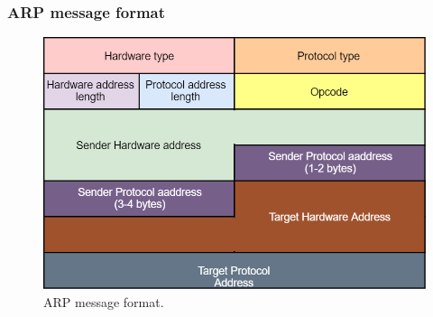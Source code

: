 \subsubsection{ARP message format}
\begin{figure}[H]
\centering
\includegraphics[scale=0.35]{Images/Layer2/ARP_format}
\caption{\footnotesize{ARP message format.}}\label{ARP}
\end{figure}

